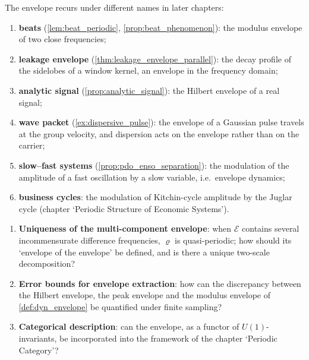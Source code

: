 \begin{remark}\label{rem:dyn_envelope_interfaces}
The envelope recurs under different names in later chapters:
\begin{enumerate}[label=(\roman*)]
    \item \textbf{beats} (\cref{lem:beat_periodic}, \cref{prop:beat_phenomenon}): the modulus envelope of two close frequencies;
    \item \textbf{leakage envelope} (\cref{thm:leakage_envelope_parallel}): the decay profile of the sidelobes of a window kernel, an envelope in the frequency domain;
    \item \textbf{analytic signal} (\cref{prop:analytic_signal}): the Hilbert envelope of a real signal;
    \item \textbf{wave packet} (\cref{ex:dispersive_pulse}): the envelope of a Gaussian pulse travels at the group velocity, and dispersion acts on the envelope rather than on the carrier;
    \item \textbf{slow--fast systems} (\cref{prop:pdo_enso_separation}): the modulation of the amplitude of a fast oscillation by a slow variable, i.e.\ envelope dynamics;
    \item \textbf{business cycles}: the modulation of Kitchin-cycle amplitude by the Juglar cycle (chapter `Periodic Structure of Economic Systems').
\end{enumerate}
\end{remark}

\begin{remark}\label{rem:dyn_envelope_open}
\begin{enumerate}[label=(\alph*)]
    \item \textbf{Uniqueness of the multi-component envelope}: when $\mathcal E$ contains several incommensurate difference frequencies, $\varrho$ is quasi-periodic; how should its `envelope of the envelope' be defined, and is there a unique two-scale decomposition?
    \item \textbf{Error bounds for envelope extraction}: how can the discrepancy between the Hilbert envelope, the peak envelope and the modulus envelope of \cref{def:dyn_envelope} be quantified under finite sampling?
    \item \textbf{Categorical description}: can the envelope, as a functor of $U(1)$-invariants, be incorporated into the framework of the chapter `Periodic Category'?
\end{enumerate}
\end{remark}


